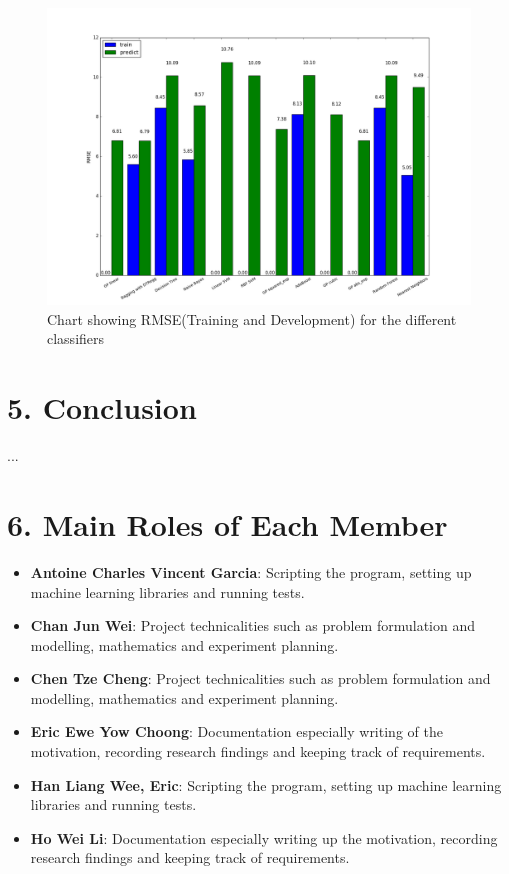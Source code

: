 \documentclass{article}
\begin{document}
 	\begin{figure}
	\includegraphics[width=\textwidth]{results}
	\caption{Chart showing RMSE(Training and Development) for the different classifiers}
	\label{rmse_results_chart}
	\end{figure}

	\section{5.  Conclusion}	
	... \\

	\section{6.  Main Roles of Each Member}
	\begin{itemize}
		\item \textbf{Antoine Charles Vincent Garcia}: 
		Scripting the program, setting up machine learning libraries and running tests.
		\item \textbf{Chan Jun Wei}: 
		Project technicalities such as problem formulation and modelling, mathematics and experiment planning.
		\item \textbf{Chen Tze Cheng}: 
		Project technicalities such as problem formulation and modelling, mathematics and experiment planning.
		\item \textbf{Eric Ewe Yow Choong}: 
		Documentation especially writing of the motivation, recording research findings and keeping track of requirements.
		\item \textbf{Han Liang Wee, Eric}: 
		Scripting the program, setting up machine learning libraries and running tests.
		\item \textbf{Ho Wei Li}: 
		Documentation especially writing up the motivation, recording research findings and keeping track of requirements.
	\end{itemize}
	
\end{document}
